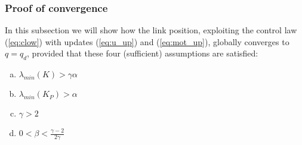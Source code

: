 \subsubsection{Proof of convergence}\label{sec:introduction}
In this subsection we will show how the link position, exploiting the control law (\ref{eq:clow}) with updates (\ref{eq:u_up}) and (\ref{eq:mot_up}), globally converges to \(q = q_d\), provided that these four (sufficient) assumptions are satisfied:
\begin{enumerate}[a)]
    \item \(\lambda_{min}(K) > \gamma \alpha\)
    \item \(\lambda_{min}(K_P) > \alpha\) 
    \item \(\gamma > 2\)
    \item \(0 < \beta < \frac{\gamma-2}{2\gamma}\)
\end{enumerate}
